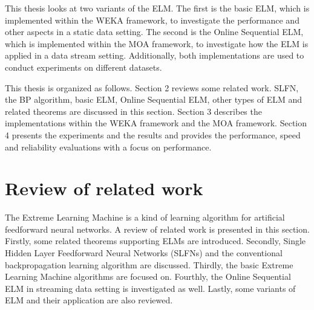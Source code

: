 \documentclass[a4paper, 14pt]{extarticle}
\begin{document}
\par This thesis looks at two variants of the ELM. The first is the basic ELM\cite{G.B.Huang-ICNN}, which is implemented within the WEKA framework\cite{frank2009weka}, to investigate the performance and other aspects in a static data setting. The second is the Online Sequential ELM\cite{liang2006fast}, which is implemented within the MOA framework\cite{bifet2010moa}, to investigate how the ELM is applied in a data stream setting. Additionally, both implementations are used to conduct experiments on different datasets. 
\par This thesis is organized as follows. Section 2 reviews some related work. SLFN, the BP algorithm, basic ELM, Online Sequential ELM, other types of ELM and related theorems are discussed in this section. Section 3 describes the implementations within the WEKA framework and the MOA framework. Section 4 presents the experiments and the results and provides the performance, speed and reliability evaluations with a focus on performance. 
\newpage
\section{ Review of related work}
The Extreme Learning Machine is a kind of learning algorithm for artificial feedforward neural networks. A review of related work is presented in this section. Firstly, some related theorems supporting ELMs are introduced. Secondly, Single Hidden Layer Feedforward Neural Networks (SLFNs) and the conventional backpropagation learning algorithm are discussed. Thirdly, the basic Extreme Learning Machine algorithms are focused on. Fourthly, the Online Sequential ELM in streaming data setting is investigated as well. Lastly, some variants of ELM and their application are also reviewed. 
\end{document}
